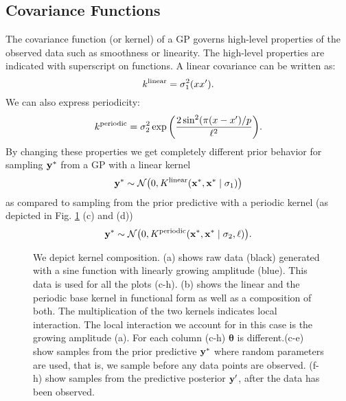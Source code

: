 \subsection{Covariance Functions}
The covariance function (or kernel) of a \ac{GP} governs high-level properties
of the observed data such as smoothness or linearity. The high-level properties
are indicated with superscript on functions.  A linear covariance can be written as:
\begin{equation}\label{eq:LIN1}
    k^\text{linear} =   \sigma_1^2(x x^\prime).
\end{equation}
We can also express periodicity:
\begin{equation}\label{eq:PER1}
    k^\text{periodic} =  \sigma_2^2 \exp \bigg( \frac{2 \sin^2 ( \pi (x - x^\prime)/p}{\ell^2} \bigg). 
\end{equation}
By changing these properties we get completely different prior behavior for sampling $\mathbf{y}^*$ from a
\ac{GP} with a linear kernel
\[
\mathbf{y}^* \sim \mathcal{N}\big(0,K^\text{linear}(\mathbf{x}^*,\mathbf{x}^* \mid \sigma_1 )\big)
\]
as compared to sampling from the prior predictive with a periodic kernel (as depicted in 
Fig. \ref{fig:composition_tutorial} (c) and (d))
\[
\mathbf{y}^* \sim \mathcal{N}\big(0,K^\text{periodic}(\mathbf{x}^*,\mathbf{x}^* \mid \sigma_2, \ell )\big).
\]
\begin{figure}

\caption{\footnotesize We depict kernel composition. 
(a) shows raw data (black) generated with a sine function with linearly growing amplitude (blue).
This data is used for all the plots (c-h). 
(b) shows the linear and the periodic base kernel in functional form as well as a composition of both. 
The multiplication of the two kernels indicates local interaction. The local interaction we account for in this case is the growing amplitude (a). For each column (c-h) $\bm{\theta}$ is different.(c-e) show samples from the prior
predictive $\mathbf{y}^*$ where random parameters are used, that is, we sample before any data points are observed.
(f-h) show samples from the predictive posterior $\mathbf{y}^\prime$, after the data has been observed.}
\label{fig:composition_tutorial}
\end{figure}
